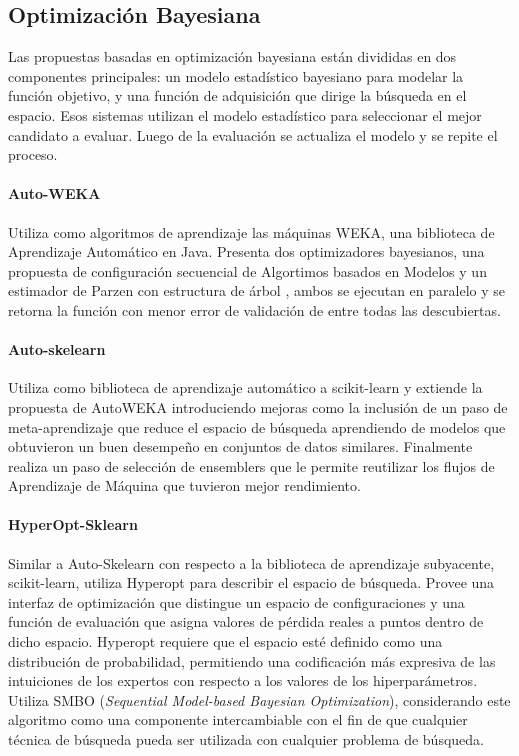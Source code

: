 \subsection{Optimizaci\'on Bayesiana}
Las propuestas basadas en optimizaci\'on bayesiana est\'an divididas en dos componentes principales: un modelo estad\'istico bayesiano para modelar la funci\'on objetivo, y una funci\'on de adquisici\'on que dirige la b\'usqueda en el espacio. Esos sistemas utilizan el modelo estad\'istico para seleccionar el mejor candidato a evaluar. Luego de la evaluaci\'on se actualiza el modelo y se repite el proceso.

\paragraph{Auto-WEKA } Utiliza como algoritmos de aprendizaje las m\'aquinas WEKA, una biblioteca de Aprendizaje Autom\'atico en Java. Presenta dos optimizadores bayesianos, una propuesta de configuraci\'on secuencial de Algortimos basados en Modelos   y un estimador de Parzen con estructura de \'arbol , ambos se ejecutan en paralelo y se retorna la funci\'on con menor error de validaci\'on de entre todas las descubiertas.

\paragraph*{Auto-skelearn } Utiliza como biblioteca de aprendizaje autom\'atico a scikit-learn  y extiende la propuesta de AutoWEKA  introduciendo mejoras como la inclusi\'on de un paso de meta-aprendizaje que reduce el espacio de b\'usqueda aprendiendo de modelos que obtuvieron un buen desempe\~no en conjuntos de datos similares. Finalmente realiza un paso de selecci\'on de ensemblers que le permite reutilizar los flujos de Aprendizaje de M\'aquina que tuvieron mejor rendimiento. 

\paragraph*{HyperOpt-Sklearn } Similar a Auto-Skelearn con respecto a la biblioteca de aprendizaje subyacente, scikit-learn, utiliza Hyperopt  para describir el espacio de b\'usqueda. Provee una interfaz de optimizaci\'on que distingue un espacio de configuraciones y una funci\'on de evaluaci\'on que asigna valores de p\'erdida reales a puntos dentro de dicho espacio. Hyperopt requiere que el espacio est\'e definido como una distribuci\'on de probabilidad, permitiendo una codificaci\'on m\'as expresiva de las intuiciones de los expertos con respecto a los valores de los hiperpar\'ametros. Utiliza SMBO (\textit{Sequential Model-based Bayesian Optimization}), considerando este algoritmo como una componente intercambiable con el fin de que cualquier t\'ecnica de b\'usqueda pueda ser utilizada con cualquier problema de b\'usqueda.

